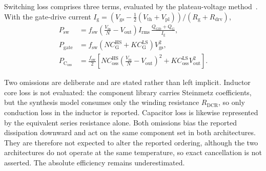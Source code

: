 \documentclass[journal]{IEEEtran}
\begin{document}
Switching loss comprises three terms, evaluated by the plateau-voltage
method~\cite{efficiency}. With the gate-drive current
$I_{\mathrm{g}} = (V_{\mathrm{gs}} - \tfrac{1}{2}(V_{\mathrm{th}}+V_{\mathrm{pl}}))/
(R_{\mathrm{g}}+R_{\mathrm{drv}})$,
\begin{align}
P_{\mathrm{sw}} &= f_{\mathrm{sw}}\!\left(\frac{V_{\mathrm{in}}}{N}-V_{\mathrm{out}}\right)
 I_{\mathrm{rms}}\,\frac{Q_{\mathrm{GD}}+Q_{\mathrm{G}}}{I_{\mathrm{g}}},
\label{eq:psw}\\
P_{\mathrm{gate}} &= f_{\mathrm{sw}}\!\left(N C_{\mathrm{G}}^{\mathrm{HS}}
 + K C_{\mathrm{G}}^{\mathrm{LS}}\right) V_{\mathrm{gs}}^{2},
\label{eq:pgate}\\
P_{\mathrm{C_{oss}}} &= \frac{f_{\mathrm{sw}}}{2}\!\left[
 N C_{\mathrm{oss}}^{\mathrm{HS}}\!\left(\frac{V_{\mathrm{in}}}{N}-V_{\mathrm{out}}\right)^{2}
 \!\!+ K C_{\mathrm{oss}}^{\mathrm{LS}} V_{\mathrm{out}}^{2}\right]\!.
\label{eq:pcoss}
\end{align}

Two omissions are deliberate and are stated rather than left implicit. Inductor core loss is
not evaluated: the component library carries Steinmetz coefficients, but the synthesis model
consumes only the winding resistance $R_{\mathrm{DCR}}$, so only conduction loss in the
inductor is reported. Capacitor loss is likewise represented by the equivalent series
resistance alone. Both omissions bias the reported dissipation downward and act on the same
component set in both architectures. They are therefore not expected to alter the reported
ordering, although the two architectures do not operate at the same temperature, so exact
cancellation is not asserted. The absolute efficiency remains underestimated.
\end{document}
